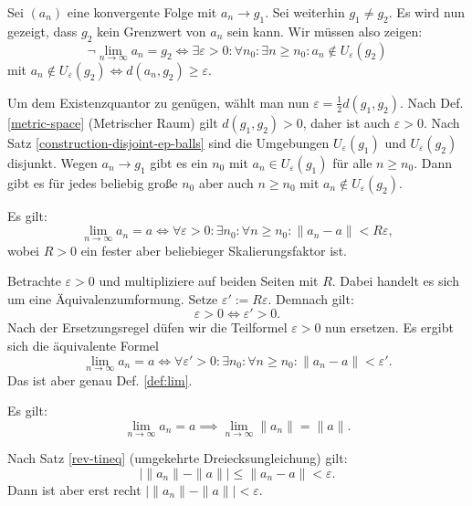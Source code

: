 \begin{Beweis}
Sei $(a_n)$ eine konvergente Folge mit $a_n\to g_1$. Sei weiterhin
$g_1\ne g_2$. Es wird nun gezeigt, dass $g_2$ kein Grenzwert von $a_n$
sein kann. Wir müssen also zeigen:
\[\neg\lim_{n\to\infty} a_n=g_2 \iff
\exists\varepsilon{>}0\colon\forall n_0\colon\exists n{\ge}n_0\colon
a_n\notin U_\varepsilon(g_2)\]
mit $a_n\notin U_\varepsilon(g_2)\iff d(a_n,g_2)\ge\varepsilon$.

Um dem Existenzquantor zu genügen, wählt man nun
$\varepsilon = \frac{1}{2}d(g_1,g_2)$.
Nach Def. \ref{metric-space} (Metrischer Raum) gilt 
$d(g_1,g_2)>0$, daher ist auch $\varepsilon>0$. Nach Satz
\ref{construction-disjoint-ep-balls} sind die Umgebungen
$U_\varepsilon(g_1)$ und $U_\varepsilon(g_2)$ disjunkt.
Wegen $a_n\to g_1$ gibt es ein $n_0$ mit $a_n\in U_\varepsilon(g_1)$ für alle
$n\ge n_0$. Dann gibt es für jedes beliebig große $n_0$ aber auch
$n\ge n_0$ mit $a_n\notin U_\varepsilon(g_2)$.\,\qedsymbol
\end{Beweis}

\begin{Satz}\label{lim-scaled-ep}
Es gilt:
\[\lim_{n\to\infty} a_n=a \iff
\forall\varepsilon{>}0\colon\exists n_0\colon\forall n{\ge}n_0\colon \|a_n-a\|<R\varepsilon,\]
wobei $R>0$ ein fester aber beliebieger Skalierungsfaktor ist.
\end{Satz}

\begin{Beweis}
Betrachte $\varepsilon>0$ und multipliziere auf beiden Seiten
mit $R$. Dabei handelt es sich um eine Äquivalenzumformung.
Setze $\varepsilon':=R\varepsilon$. Demnach gilt:
\[\varepsilon>0 \iff \varepsilon'>0.\]
Nach der Ersetzungsregel düfen wir die Teilformel $\varepsilon>0$
nun ersetzen. Es ergibt sich die äquivalente Formel
\[\lim_{n\to\infty} a_n=a \iff
\forall\varepsilon'{>}0\colon\exists n_0\colon\forall n{\ge}n_0\colon
\|a_n-a\|<\varepsilon'.\]
Das ist aber genau Def. \ref{def:lim}.\,\qedsymbol
\end{Beweis}

\begin{Satz}
Es gilt:
\[\lim_{n\to\infty} a_n = a\implies \lim_{n\to\infty} \|a_n\| = \|a\|.\]
\end{Satz}

\begin{Beweis}
Nach Satz \ref{rev-tineq} (umgekehrte Dreiecksungleichung) gilt:
\[|\|a_n\|-\|a\|| \le \|a_n-a\| < \varepsilon.\]
Dann ist aber erst recht $|\|a_n\|-\|a\||<\varepsilon$.\,\qedsymbol
\end{Beweis}

